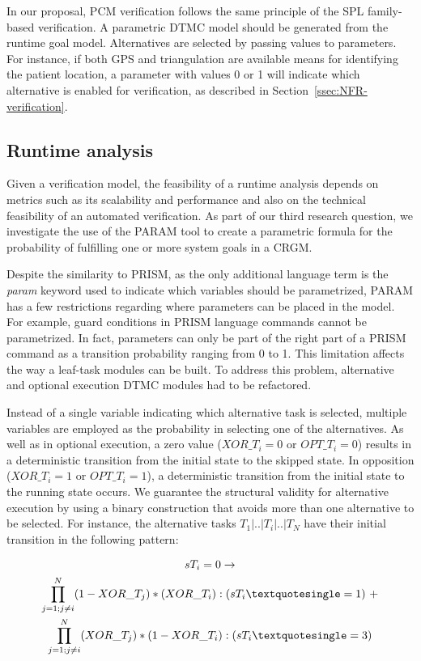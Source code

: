 In our proposal, PCM verification follows the same principle of the SPL family-based verification. A parametric DTMC model should be generated from the runtime goal model. Alternatives are selected by passing values to parameters. For instance, if both GPS and triangulation are available means for identifying the patient location, a parameter with values 0 or 1 will indicate which alternative is enabled for verification, as described in Section~\ref{ssec:NFR-verification}.

\subsection{Runtime analysis}

Given a verification model, the feasibility of a runtime analysis depends on metrics such as its scalability and performance and also on the technical feasibility of an automated verification. As part of our third research question, we investigate the use of the PARAM tool to create a parametric formula for the probability of fulfilling one or more system goals in a CRGM.

Despite the similarity to PRISM, as the only additional language term is the \textit{param} keyword used to indicate which variables should be parametrized, PARAM has a few restrictions regarding where parameters can be placed in the model. For example, guard conditions in PRISM language commands cannot be parametrized. In fact, parameters can only be part of the right part of a PRISM command as a transition probability ranging from 0 to 1. This limitation affects the way a leaf-task modules can be built. To address this problem, alternative and optional execution DTMC modules had to be refactored. 

Instead of a single variable indicating which alternative task is selected, multiple variables are employed as the probability in selecting one of the alternatives. As well as in optional execution, a zero value ($XOR\_T_i=0$ or $OPT\_T_i=0$) results in a deterministic transition from the initial state to the skipped state. In opposition ($XOR\_T_i=1$ or $OPT\_T_i=1$), a deterministic transition from the initial state to the running state occurs. We guarantee the structural validity for alternative execution by using a binary construction that avoids more than one alternative to be selected. For instance, the alternative tasks $T_1|..|T_i|..|T_N$ have their initial transition in the following pattern:

\begin{multline}
[success] sT_i = 0 \rightarrow \\ \prod_{j=1;j \neq i}^{N}(1 - XOR\_T_j) * (XOR\_T_i) : (sT_i\squote=1)\ + \\\prod_{j=1;j \neq i}^{N}(XOR\_T_j) * (1 - XOR\_T_i) : (sT_i\squote=3)
\end{multline}

